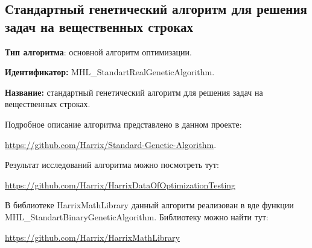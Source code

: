 \subsection{Стандартный генетический алгоритм для решения задач на вещественных строках}\label{HarrixOptimizationAlgorithms:MHL_StandartRealGeneticAlgorithm}

\textbf{Тип алгоритма}: основной алгоритм оптимизации.

\textbf{Идентификатор:} MHL\_StandartRealGeneticAlgorithm.

\textbf{Название:} стандартный генетический алгоритм для решения задач на вещественных строках.

Подробное описание алгоритма представлено в данном проекте:

\href{https://github.com/Harrix/Standard-Genetic-Algorithm}{https://github.com/Harrix/Standard-Genetic-Algorithm}. 

Результат исследований алгоритма можно посмотреть тут:

\href{https://github.com/Harrix/HarrixDataOfOptimizationTesting}{https://github.com/Harrix/HarrixDataOfOptimizationTesting}

В библиотеке HarrixMathLibrary данный алгоритм реализован в вде функции MHL\_StandartBinaryGeneticAlgorithm. Библиотеку можно найти тут:

\href{https://github.com/Harrix/HarrixMathLibrary}{https://github.com/Harrix/HarrixMathLibrary}
